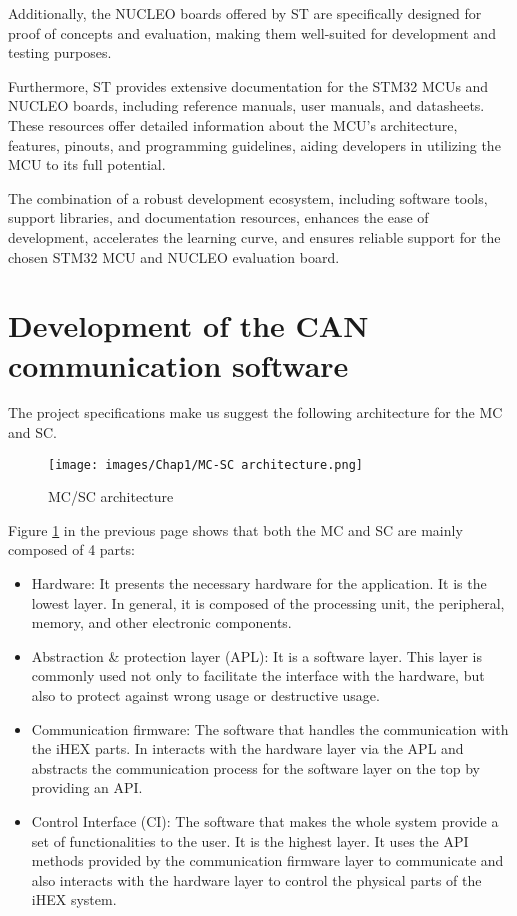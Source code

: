 Additionally, the NUCLEO boards offered by ST are specifically designed for proof of concepts and evaluation, making them well-suited for development and testing purposes.

Furthermore, ST provides extensive documentation for the STM32 MCUs and NUCLEO boards, including reference manuals, user manuals, and datasheets. These resources offer detailed information about the MCU's architecture, features, pinouts, and programming guidelines, aiding developers in utilizing the MCU to its full potential.

The combination of a robust development ecosystem, including software tools, support libraries, and documentation resources, enhances the ease of development, accelerates the learning curve, and ensures reliable support for the chosen STM32 MCU and NUCLEO evaluation board.

\section{Development of the CAN communication software}

The project specifications make us suggest the following architecture for the MC and SC.

\begin{figure}[H]
\begin{center}
\texttt{[image: images/Chap1/MC-SC architecture.png]}\\
\caption{MC/SC architecture}
\label{MC SC architecture}
\end{center}
\end{figure} 
\newpage
Figure \ref{MC SC architecture} in the previous page shows that both the MC and SC are mainly composed of 4 parts:
\begin{itemize}
    \item Hardware: It presents the necessary hardware for the application. It is the lowest layer. In general, it is composed of the processing unit, the peripheral, memory, and other electronic components.
    \item Abstraction \& protection layer (APL): It is a software layer. This layer is commonly used not only to facilitate the interface with the hardware, but also to protect against wrong usage or destructive usage.
    \item Communication firmware: The software that handles the communication with the iHEX parts. In interacts with the hardware layer via the APL and abstracts the communication process for the software layer on the top by providing an API.
    \item Control Interface (CI): The software that makes the whole system provide a set of functionalities to the user. It is the highest layer. It uses the API methods provided by the communication firmware layer to communicate and also interacts with the hardware layer to control the physical parts of the iHEX system.
\end{itemize}


